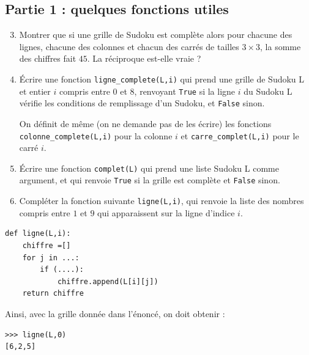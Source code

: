 \documentclass[a4paper,french,11pt,twoside]{VcCours}
\begin{document}
\bigskip

\begin{center}
 \subsection*{Partie 1 : quelques fonctions utiles}
\end{center}

\medskip

\begin{enumerate}
\setcounter{enumi}{2}
\item Montrer que si une grille de Sudoku est complète alors pour chacune des lignes, chacune des colonnes et chacun des carrés de tailles $3 \times 3$, la somme des chiffres fait $45$. La réciproque est-elle vraie ?
\item Écrire une fonction {\tt ligne\_complete(L,i)} qui prend une grille de Sudoku L et entier $i$ compris entre $0$ et $8$, renvoyant {\tt True} si la ligne $i$ du Sudoku L vérifie les conditions de remplissage d'un Sudoku, et {\tt False} sinon.

\medskip

On définit de même (on ne demande pas de les écrire) les fonctions {\tt colonne\_complete(L,i)} pour la colonne $i$ et {\tt carre\_complet(L,i)} pour le carré $i$.
\item Écrire une fonction {\tt complet(L)} qui prend une liste Sudoku L comme argument, et qui renvoie {\tt True} si la grille est complète et {\tt False} sinon.
\item Compléter la fonction suivante {\tt ligne(L,i)}, qui renvoie la liste des nombres compris entre $1$ et $9$ qui apparaissent sur la ligne d'indice $i$.
\end{enumerate}

\begin{center}
\begin{minipage}{0.7\textwidth}
		
\begin{lstlisting}
def ligne(L,i):
    chiffre =[]
    for j in ...:
        if (....):
            chiffre.append(L[i][j])
    return chiffre
\end{lstlisting}

\end{minipage}
\end{center}

\medskip

Ainsi, avec la grille donnée dans l'énoncé, on doit obtenir :

\begin{center}
\begin{minipage}{0.7\textwidth}
		
\begin{lstlisting}
>>> ligne(L,0)
[6,2,5]
\end{lstlisting}

\end{minipage}
\end{center}
\end{document}
